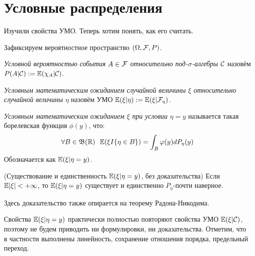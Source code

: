 \section{Условные распределения}

\begin{note}
    Изучили свойства УМО. Теперь хотим понять, как его считать.
\end{note}

\begin{note}
    Зафиксируем вероятностное пространство $(\Omega, \mathcal{F}, P)$.
\end{note}

\begin{definition}
	\textit{Условной вероятностью события $A \in \mathcal{F}$ относительно под-$\sigma$-алгебры $\mathcal{C}$} назовём $P(A | \mathcal{C}) := \mathbb{E}(\chi_A | \mathcal{C})$.
\end{definition}

\begin{definition}
	\textit{Условным математическим ожиданием случайной величины $\xi$ относительно случайной величины $\eta$} назовём УМО $\mathbb{E}(\xi | \eta) := \mathbb{E}(\xi | \mathcal{F}_\eta)$.
\end{definition}

\begin{definition}
    \textit{Условным математическим ожиданием $\xi$ при условии $\eta = y$} называется такая борелевская функция $\phi(y)$, что:
    \[
        \forall B \in \mathfrak{B}(\mathbb{R}) \ \ \mathbb{E}(\xi I\{\eta \in B\}) = \int_{B} \varphi(y) dP_\eta(y)
    \]
    Обозначается как $\mathbb{E}(\xi | \eta = y)$.
\end{definition}

\begin{theorem} (Существование и единственность $\mathbb{E}(\xi | \eta = y)$, без доказательства)
    Если $\mathbb{E}|\xi| < +\infty$, то $\mathbb{E}(\xi | \eta = y)$ существует и единственно $P_\eta$-почти наверное.
\end{theorem}

\begin{note}
    Здесь доказательство также опирается на теорему Радона-Никодима.
\end{note}

\begin{note}
    Свойства $\mathbb{E}(\xi | \eta = y)$ практически полностью повторяют свойства УМО $\mathbb{E}(\xi | \mathcal{C})$, поэтому не будем приводить ни формулировки, ни доказательства. Отметим, что в частности выполнены линейность, сохранение отношения порядка, предельный переход.
\end{note}

